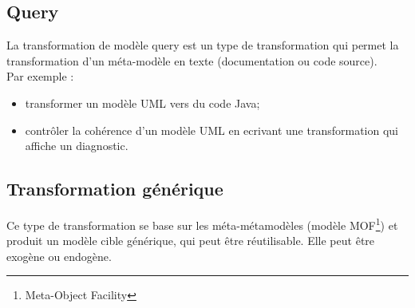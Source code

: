 \subsection{Query}
La transformation de mod{\`e}le query est un type de transformation qui permet la transformation d'un m{\'e}ta-mod{\`e}le en texte (documentation ou code source).\\
Par exemple :
\begin{itemize}
\item transformer un mod{\`e}le UML vers du code Java;
\item contr{\^o}ler la coh{\'e}rence d'un mod{\`e}le UML en ecrivant une transformation qui affiche un diagnostic.
\end{itemize}

\subsection{Transformation g{\'e}n{\'e}rique}
Ce type de transformation se base sur les m{\'e}ta-m{\'e}tamod{\`e}les (mod{\`e}le MOF\protect\footnote{Meta-Object Facility}) et produit un mod{\`e}le cible g{\'e}n{\'e}rique, qui peut {\^e}tre r{\'e}utilisable. Elle peut {\^e}tre exog{\`e}ne ou endog{\`e}ne.
